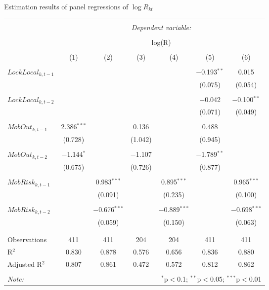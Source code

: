   \caption{Estimation results of panel regressions of $\log R_{kt}$} 
\small 
\begin{tabular}{@{\extracolsep{5pt}}lcccccc} 
\\[-1.8ex]\hline 
\hline \\[-1.8ex] 
 & \multicolumn{6}{c}{\textit{Dependent variable:}} \\ 
\cline{2-7} 
\\[-1.8ex] & \multicolumn{6}{c}{log(R)} \\ 
\\[-1.8ex] & (1) & (2) & (3) & (4) & (5) & (6)\\ 
\hline \\[-1.8ex] 
 $LockLocal_{k,t-1}$ &  &  &  &  & $-$0.193$^{**}$ & 0.015 \\ 
  &  &  &  &  & (0.075) & (0.054) \\ 
  & & & & & & \\ 
 $LockLocal_{k,t-2}$ &  &  &  &  & $-$0.042 & $-$0.100$^{**}$ \\ 
  &  &  &  &  & (0.071) & (0.049) \\ 
  & & & & & & \\ 
 $MobOut_{k,t-1}$ & 2.386$^{***}$ &  & 0.136 &  & 0.488 &  \\ 
  & (0.728) &  & (1.042) &  & (0.945) &  \\ 
  & & & & & & \\ 
 $MobOut_{k,t-2}$ & $-$1.144$^{*}$ &  & $-$1.107 &  & $-$1.789$^{**}$ &  \\ 
  & (0.675) &  & (0.726) &  & (0.877) &  \\ 
  & & & & & & \\ 
 $MobRisk_{k,t-1}$ &  & 0.983$^{***}$ &  & 0.895$^{***}$ &  & 0.965$^{***}$ \\ 
  &  & (0.091) &  & (0.235) &  & (0.100) \\ 
  & & & & & & \\ 
 $MobRisk_{k,t-2}$ &  & $-$0.676$^{***}$ &  & $-$0.889$^{***}$ &  & $-$0.698$^{***}$ \\ 
  &  & (0.059) &  & (0.150) &  & (0.063) \\ 
  & & & & & & \\ 
\hline \\[-1.8ex] 
Observations & 411 & 411 & 204 & 204 & 411 & 411 \\ 
R$^{2}$ & 0.830 & 0.878 & 0.576 & 0.656 & 0.836 & 0.880 \\ 
Adjusted R$^{2}$ & 0.807 & 0.861 & 0.472 & 0.572 & 0.812 & 0.862 \\ 
\hline 
\hline \\[-1.8ex] 
\textit{Note:}  & \multicolumn{6}{r}{$^{*}$p$<$0.1; $^{**}$p$<$0.05; $^{***}$p$<$0.01} \\ 
\end{tabular} 